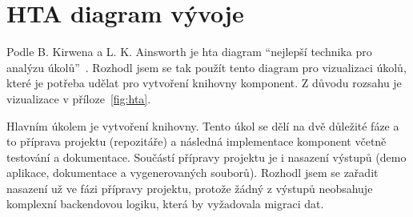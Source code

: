 \section{HTA diagram vývoje}

Podle B. Kirwena a L. K. Ainsworth je \gls{hta} diagram ``nejlepší technika pro analýzu úkolů''~\cite{kirwan1992}.
Rozhodl jsem se tak použít tento diagram pro vizualizaci úkolů, které je potřeba udělat pro vytvoření knihovny komponent.
Z důvodu rozsahu je vizualizace v příloze~\ref{fig:hta}.

Hlavním úkolem je vytvoření knihovny. Tento úkol se dělí na dvě důležité fáze a to příprava projektu (repozitáře) a následná implementace komponent včetně testování a dokumentace.
Součástí přípravy projektu je i nasazení výstupů (demo aplikace, dokumentace a vygenerovaných souborů).
Rozhodl jsem se zařadit nasazení už ve fázi přípravy projektu, protože žádný z výstupů neobsahuje komplexní backendovou logiku, která by vyžadovala migraci dat.

